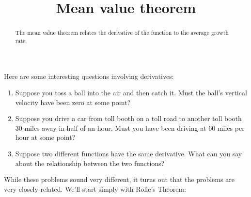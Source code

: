 \documentclass{ximera}
\title{Mean value theorem}
\begin{document}
\begin{abstract}
  The mean value theorem relates the derivative of the function to the
  average growth rate.
\end{abstract}
\maketitle

Here are some  interesting questions involving derivatives:

\begin{enumerate}
\item Suppose you toss a ball into the air and then catch it. Must the
  ball's vertical velocity have been zero at some point?
\item Suppose you drive a car from toll booth on a toll road to
  another toll booth $30$ miles away in half of an hour. Must you have
  been driving at $60$ miles per hour at some point?
\item Suppose two different functions have the same derivative. What
  can you say about the relationship between the two functions?
\end{enumerate}

While these problems sound very different, it turns out that the
problems are very closely related. We'll start simply with Rolle's Theorem:
\end{document}
